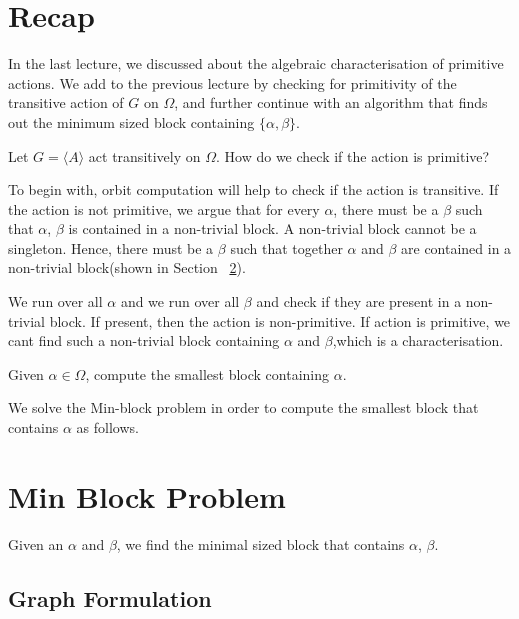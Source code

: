 



\section{Recap}
In the last lecture, we discussed about the algebraic characterisation of primitive actions. We add to the previous lecture by checking for primitivity of the transitive action of $G$ on $\Omega$, and further continue with an algorithm that finds out the minimum sized block containing $\{\alpha,\beta\}$.

\begin{problem}
Let $G=\langle A \rangle$ act transitively on $\Omega$.
How do we check if the action is primitive?
\end{problem}

To begin with, orbit computation will help to check if the action is transitive. If the action is not primitive, we argue that for every $\alpha$, there must be a $\beta$ such that {$\alpha$, $\beta$} is contained in a non-trivial block.
A non-trivial block cannot be a singleton. Hence, there must be a $\beta$ such that together $\alpha$ and $\beta$ are contained in a non-trivial block(shown in Section ~\ref{sec:min-block}).

We run over all $\alpha$ and we run over all $\beta$ and check if they are present in a non-trivial block. If present, then the action is non-primitive. If action is primitive, we cant find such a non-trivial block containing $\alpha$ and $\beta$,which is a characterisation.

\begin{problem}
Given $\alpha \in \Omega$, compute the smallest block containing $\alpha$.
\end{problem}

We solve the Min-block problem in order to compute the smallest block that contains $\alpha$ as follows.

\section{Min Block Problem}
\label{sec:min-block}
Given an $\alpha$ and $\beta$, we find the minimal sized block that contains {$\alpha$, $\beta$}.

\subsection{Graph Formulation}

